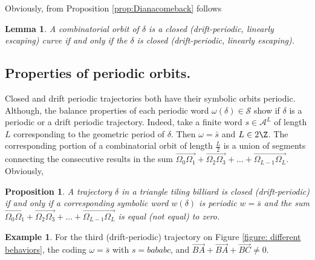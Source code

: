 \documentclass[12pt]{article}
\newtheorem{lemma}{Lemma}
\newtheorem{proposition}{Proposition}
\theoremstyle{definition}
\newtheorem*{example}{Example}
\begin{document}
Obviously, from Proposition \ref{prop:Dianacomeback} follows
\begin{lemma}\label{prop:HW}
A combinatorial orbit of $\delta$ is a closed (drift-periodic, linearly escaping) curve if and only if the $\delta$ is closed (drift-periodic, linearly escaping).  
\end{lemma}

\subsection{Properties of periodic orbits.}\label{subs:properties_periodic}
Closed and drift periodic trajectories both have their symbolic orbits periodic. Although, the balance properties of each periodic word $\omega(\delta) \in \mathcal{S}$ show if $\delta$ is a periodic or a drift periodic trajectory. Indeed, take a finite word $s \in \mathcal{A}^L$ of length $L$ corresponding to the geometric period of $\delta$. Then $\omega=\bar{s}$ and $L \in 2 \Z$. The corresponding portion of a combinatorial orbit of length $\frac{L}{2}$ is a union of segments connecting the consecutive results in the sum $\overrightarrow{\Omega_0 \Omega_1}+ \overrightarrow{\Omega_2 \Omega_3}+ \ldots+ \overrightarrow{\Omega_{L-1} \Omega_{L}}$. Obviously,

\begin{proposition}
A trajectory $\delta$ in a triangle tiling billiard is closed (drift-periodic) if and only if a corresponding symbolic word $w(\delta)$ is periodic $w=\bar{s}$ and the sum $\overrightarrow{\Omega_0 \Omega_1}+ \overrightarrow{\Omega_2 \Omega_3}+ \ldots+ \overrightarrow{\Omega_{L-1} \Omega_{L}}$ is equal (not equal) to zero.
\end{proposition}

\begin{example}
For the third (drift-periodic) trajectory on Figure \ref{figure: different behaviors}, the coding $\omega=\bar{s}$ with $s=bababc$, and $\overrightarrow{BA}+\overrightarrow{BA}+\overrightarrow{BC}\neq 0$.
\end{example}
\end{document}
